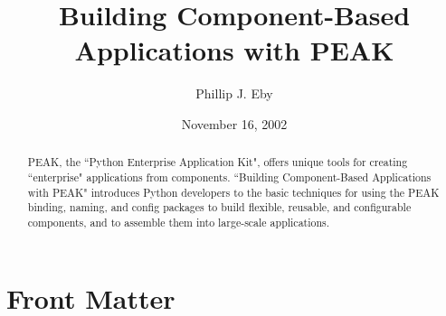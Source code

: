\documentclass{manual}
\title{Building Component-Based \\ Applications with PEAK}
\author{Phillip J. Eby}
\date{November 16, 2002}       %
\begin{document}
\maketitle

\ifhtml
\chapter*{Front Matter\label{front}}
\fi

%

\begin{abstract}

\noindent

PEAK, the ``Python Enterprise Application Kit", offers unique tools for
creating ``enterprise" applications from components.  ``Building
Component-Based Applications with PEAK" introduces Python developers to
the basic techniques for using the PEAK binding, naming, and config
packages to build flexible, reusable, and configurable components, and
to assemble them into large-scale applications.

\end{abstract}

\tableofcontents





%

%












%
%
%
\renewcommand{\indexname}{Module Index}

\renewcommand{\indexname}{Index}
\end{document}
